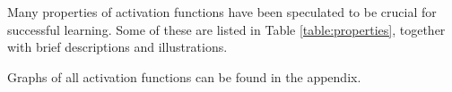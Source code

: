 Many properties of activation functions have been speculated to be crucial for successful learning. 
Some of these are listed in Table \ref{table:properties}, together with brief descriptions and illustrations. 

Graphs of all activation functions can be found in the appendix. 